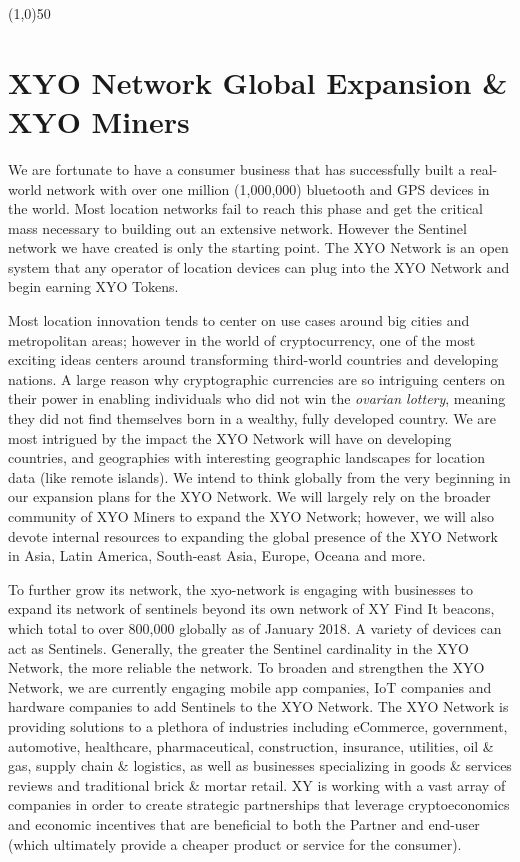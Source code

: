 \documentclass{article}
\begin{document}
\begin{center}
\line(1,0){50}
\end{center}


\section {XYO Network Global Expansion \& XYO Miners}
We are fortunate to have a consumer business that has successfully built a real-world network with over one million (1,000,000) bluetooth and GPS devices in the world. Most location networks fail to reach this phase and get the critical mass necessary to building out an extensive network. However the Sentinel network we have created is only the starting point. The XYO Network is an open system that any operator of location devices can plug into the XYO Network and begin earning XYO Tokens. 

Most location innovation tends to center on use cases around big cities and metropolitan areas; however in the world of cryptocurrency, one of the most exciting ideas centers around transforming third-world countries and developing nations. A large reason why cryptographic currencies are so intriguing centers on their power in enabling individuals who did not win the \textit{ovarian lottery}, meaning they did not find themselves born in a wealthy, fully developed country. We are most intrigued by the impact the XYO Network will have on developing countries, and geographies with interesting geographic landscapes for location data (like remote islands). We intend to think globally from the very beginning in our expansion plans for the XYO Network. We will largely rely on the broader community of XYO Miners to expand the XYO Network; however, we will also devote internal resources to expanding the global presence of the XYO Network in Asia, Latin America, South-east Asia, Europe, Oceana and more.

To further grow its network, the \Gls{xyo-network} is engaging with businesses to expand its network of \Glspl{sentinel} beyond its own network of XY Find It beacons, which total to over 800,000 globally as of January 2018. A variety of devices can act as Sentinels. Generally, the greater the Sentinel cardinality in the XYO Network, the more reliable the network. To broaden and strengthen the XYO Network, we are currently engaging mobile app companies, IoT companies and hardware companies to add Sentinels to the XYO Network. The XYO Network is providing solutions to a plethora of industries including eCommerce, government, automotive, healthcare, pharmaceutical, construction, insurance, utilities, oil \& gas, supply chain \& logistics, as well as businesses specializing in goods \& services reviews and traditional brick \& mortar retail. XY is working with a vast array of companies in order to create strategic partnerships that leverage \gls{cryptoeconomics} and economic incentives that are beneficial to both the Partner and end-user (which ultimately provide a cheaper product or service for the consumer).
\end{document}
